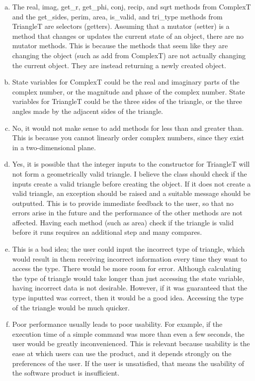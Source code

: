 \documentclass[12pt]{article}
\begin{document}
\begin{enumerate}[(a)]

\item The real, imag, get\_r, get\_phi, conj, recip, and sqrt methods from ComplexT and the get\_sides, perim, area, is\_valid, and tri\_type methods from TriangleT are selectors (getters). Assuming that a mutator (setter) is a method that changes or updates the current state of an object, there are no mutator methods. This is because the methods that seem like they are changing the object (such as add from ComplexT) are not actually changing the current object. They are instead returning a newly created object.
\item State variables for ComplexT could be the real and imaginary parts of the complex number, or the magnitude and phase of the complex number. State variables for TriangleT could be the three sides of the triangle, or the three angles made by the adjacent sides of the triangle.
\item No, it would not make sense to add methods for less than and greater than. This is because you cannot linearly order complex numbers, since they exist in a two-dimensional plane.
\item Yes, it is possible that the integer inputs to the constructor for TriangleT will not form a geometrically valid triangle. I believe the class should check if the inputs create a valid triangle before creating the object. If it does not create a valid triangle, an exception should be raised and a suitable message should be outputted. This is to provide immediate feedback to the user, so that no errors arise in the future and the performance of the other methods are not affected. Having each method (such as area) check if the triangle is valid before it runs requires an additional step and many compares. 
\item This is a bad idea; the user could input the incorrect type of triangle, which would result in them receiving incorrect information every time they want to access the type. There would be more room for error. Although calculating the type of triangle would take longer than just accessing the state variable, having incorrect data is not desirable. However, if it was guaranteed that the type inputted was correct, then it would be a good idea. Accessing the type of the triangle would be much quicker.
\item Poor performance usually leads to poor usability. For example, if the execution time of a simple command was more than even a few seconds, the user would be greatly inconvenienced. This is relevant because usability is the ease at which users can use the product, and it depends strongly on the preferences of the user. If the user is unsatisfied, that means the usability of the software product is insufficient.

\end{enumerate}
\end{document}
